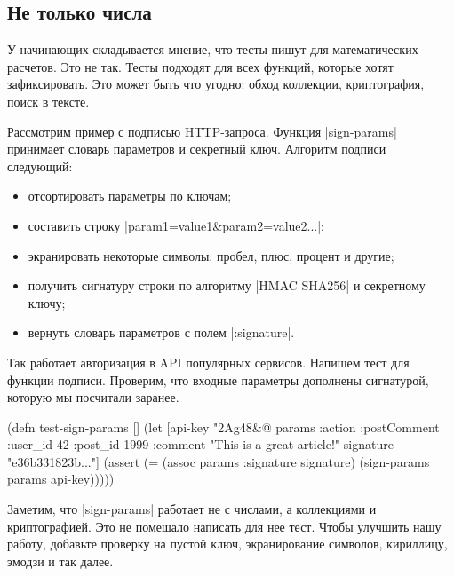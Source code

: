 \subsection{Не только числа}

У начинающих складывается мнение, что тесты пишут для математических
расчетов. Это не так. Тесты подходят для всех функций, которые хотят
зафиксировать. Это может быть что угодно: обход коллекции, криптография, поиск в
тексте.

Рассмотрим пример с подписью HTTP-запроса. Функция \spverb|sign-params|
принимает словарь параметров и секретный ключ. Алгоритм подписи следующий:

\begin{itemize}

\item
  отсортировать параметры по ключам;

\item
  составить строку \spverb|param1=value1&param2=value2...|;

\item
  экранировать некоторые символы: пробел, плюс, процент и другие;

\item
  получить сигнатуру строки по алгоритму \spverb|HMAC SHA256| и секретному
  ключу;

\item
  вернуть словарь параметров с полем \spverb|:signature|.

\end{itemize}

Так работает авторизация в API популярных сервисов. Напишем тест для функции
подписи. Проверим, что входные параметры дополнены сигнатурой, которую мы
посчитали заранее.

\begin{english}
  \begin{clojure}
(defn test-sign-params []
  (let [api-key "2Ag48&@%
        params {:action :postComment
                :user_id 42
                :post_id 1999
                :comment "This is a great article!"}
        signature "e36b331823b..."]
    (assert (= (assoc params :signature signature)
               (sign-params params api-key)))))
  \end{clojure}
\end{english}

Заметим, что \spverb|sign-params| работает не с числами, а коллекциями и
криптографией. Это не помешало написать для нее тест. Чтобы улучшить нашу
работу, добавьте проверку на пустой ключ, экранирование символов, кириллицу,
эмодзи и так далее.

